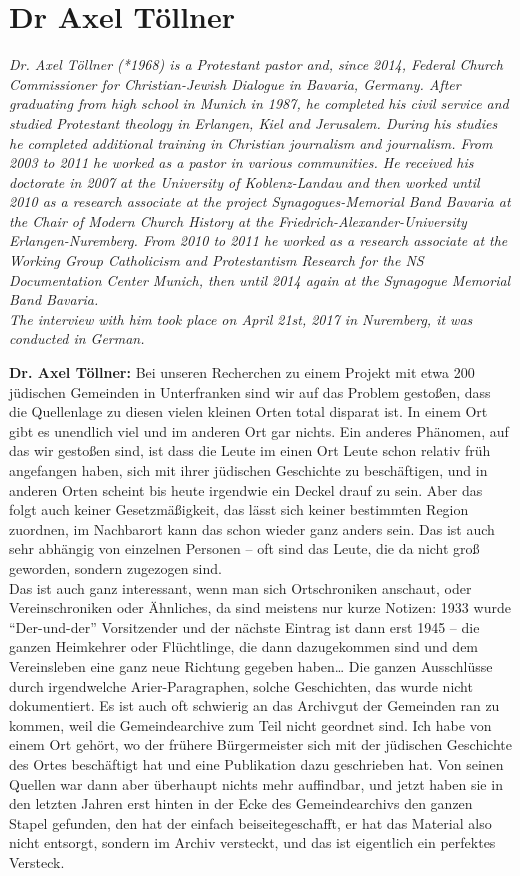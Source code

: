 \section{Dr Axel Töllner}

\textit{Dr. Axel Töllner (*1968) is a Protestant pastor and, since 2014, Federal Church Commissioner for Christian-Jewish Dialogue in Bavaria, Germany. After graduating from high school in Munich in 1987, he completed his civil service and studied Protestant theology in Erlangen, Kiel and Jerusalem. During his studies he completed additional training in Christian journalism and journalism. From 2003 to 2011 he worked as a pastor in various communities. He received his doctorate in 2007 at the University of Koblenz-Landau and then worked until 2010 as a research associate at the project Synagogues-Memorial Band Bavaria at the Chair of Modern Church History at the Friedrich-Alexander-University Erlangen-Nuremberg. From 2010 to 2011 he worked as a research associate at the Working Group Catholicism and Protestantism Research for the NS Documentation Center Munich, then until 2014 again at the Synagogue Memorial Band Bavaria. \\
The interview with him took place on April 21st, 2017 in Nuremberg, it was conducted in German.}\par  
\vspace*{2em}
\textbf{Dr. Axel Töllner:} Bei unseren Recherchen zu einem Projekt mit etwa 200 jüdischen Gemeinden in Unterfranken sind wir auf das Problem gestoßen, dass die Quellenlage zu diesen vielen kleinen Orten total disparat ist. In einem Ort gibt es unendlich viel und im anderen Ort gar nichts. Ein anderes Phänomen, auf das wir gestoßen sind, ist dass die Leute im einen Ort Leute schon relativ früh angefangen haben, sich mit ihrer jüdischen Geschichte zu beschäftigen, und in anderen Orten scheint bis heute irgendwie ein Deckel drauf zu sein. Aber das folgt auch keiner Gesetzmäßigkeit, das lässt sich keiner bestimmten Region zuordnen, im Nachbarort kann das schon wieder ganz anders sein. Das ist auch sehr abhängig von einzelnen Personen – oft sind das Leute, die da nicht groß geworden, sondern zugezogen sind.\\
Das ist auch ganz interessant, wenn man sich Ortschroniken anschaut, oder Vereinschroniken oder Ähnliches, da sind meistens nur kurze Notizen: 1933 wurde "`Der-und-der"' Vorsitzender und der nächste Eintrag ist dann erst 1945 – die ganzen Heimkehrer oder Flüchtlinge, die dann dazugekommen sind und dem Vereinsleben eine ganz neue Richtung gegeben haben… Die ganzen Ausschlüsse durch irgendwelche Arier-Paragraphen, solche Geschichten, das wurde nicht dokumentiert. 
Es ist auch oft schwierig an das Archivgut der Gemeinden ran zu kommen, weil die Gemeindearchive zum Teil nicht geordnet sind. Ich habe von einem Ort gehört, wo der frühere Bürgermeister sich mit der jüdischen Geschichte des Ortes beschäftigt hat und eine Publikation dazu geschrieben hat. Von seinen Quellen war dann aber überhaupt nichts mehr auffindbar, und jetzt haben sie in den letzten Jahren erst hinten in der Ecke des Gemeindearchivs den ganzen Stapel gefunden, den hat der einfach beiseitegeschafft, er hat das Material also nicht entsorgt, sondern im Archiv versteckt, und das ist eigentlich ein perfektes Versteck. 

